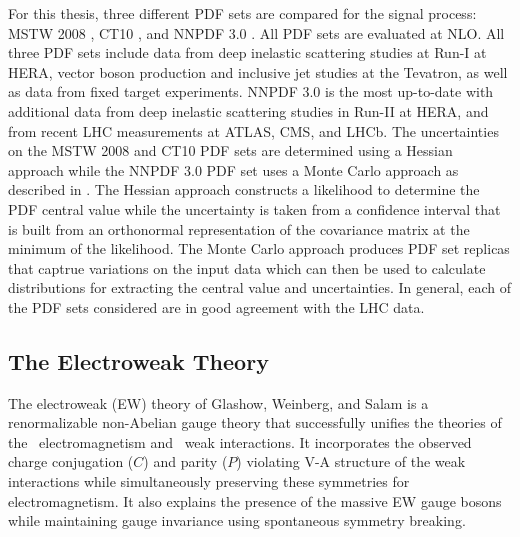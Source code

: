For this thesis, three different PDF sets are compared for the signal 
process: MSTW 2008 \cite{Martin:2009iq}, CT10 \cite{guzzi:2011sv},  and
NNPDF 3.0 \cite{Ball:2014uwa}. All PDF sets are evaluated at NLO.
All three PDF sets include data from deep inelastic scattering studies
at Run-I at HERA, vector boson production and 
inclusive jet studies at the Tevatron, as well as data from fixed
target experiments.
NNPDF 3.0 is the most up-to-date with additional 
data from deep inelastic scattering
studies in Run-II at HERA, and from recent LHC measurements at ATLAS, CMS, and
LHCb.
The uncertainties on the MSTW 2008 and CT10 PDF sets are 
determined using a Hessian approach while the NNPDF 3.0 PDF set uses
a Monte Carlo approach as described in \cite{Botje:2011sn}.
The Hessian approach constructs a likelihood to determine the PDF central 
value while the uncertainty is taken from a confidence interval
that is built from an orthonormal representation of the covariance matrix
at the minimum of the likelihood.
The Monte Carlo approach produces PDF set replicas
that captrue variations on the input data which can then be used
to calculate distributions for extracting the central value and uncertainties.
In general, each of the PDF sets considered are in good agreement with the LHC data.





\subsection{The Electroweak Theory}
\label{sec:theory_ew}
The electroweak (EW) 
theory of Glashow, Weinberg, and 
Salam \cite{glashow:1961tr,Salam:1968rm,weinberg:1967tq}
is a renormalizable \cite{hooft1971renormalization,Hooft1971167}
non-Abelian gauge theory 
that successfully unifies the theories 
of the \uone~electromagnetism and \sutwo~weak interactions.
It incorporates the observed 
charge conjugation ($C$) 
and parity ($P$) violating V-A structure of the weak interactions
\cite{PhysRev.105.1413,Garwin:1957hc,PhysRev.106.1290}
while simultaneously preserving these symmetries for electromagnetism.
It also explains the presence of the massive EW gauge bosons 
while maintaining gauge invariance
using spontaneous symmetry breaking.

